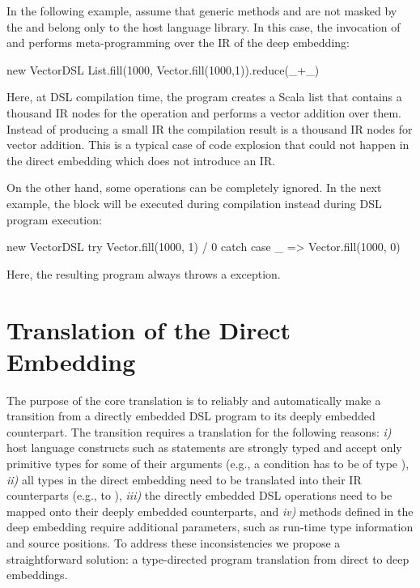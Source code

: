 In the following example, assume that generic methods  and
 are not masked by the  and belong only to the host
language library. In this case, the invocation of  and 
performs meta-programming over the IR of the deep embedding:\vspace{3pt}

\begin{listingtiny}
  new VectorDSL {
    List.fill(1000, Vector.fill(1000,1)).reduce(_+_)
  }
\end{listingtiny}\vspace{3pt}

Here, at DSL compilation time, the program creates a Scala list that contains a thousand
IR nodes for the  operation and performs a vector addition over them.
Instead of producing a small IR the compilation result is a thousand IR nodes for
vector addition. This is a typical case of code explosion that could not happen
in the direct embedding which does not introduce an IR.

On the other hand, some operations can be completely ignored. In the next
example, the  block will be executed during \edsl compilation
instead during DSL program execution:\vspace{3pt}

\begin{listingtiny}
  new VectorDSL {
    try Vector.fill(1000, 1) / 0
    catch { case _ => Vector.fill(1000, 0) }
  }
\end{listingtiny}

Here, the resulting program always throws a 
exception.

\section{Translation of the Direct Embedding}
\label{sec:translation}


The purpose of the core \tool translation is to reliably and automatically make
a transition from a directly embedded DSL program to its deeply embedded
counterpart. The transition requires a translation for the following reasons:
\emph{i)} host language constructs such as  statements are strongly
typed and accept only primitive types for some of their arguments (e.g., a
condition has to be of type ), \emph{ii)} all types in the direct
embedding need to be translated into their IR counterparts (e.g.,  to
), \emph{iii)} the directly embedded DSL operations need to be
mapped onto their deeply embedded counterparts, and \emph{iv)} methods defined
in the deep embedding require additional parameters, such as run-time type
information and source positions. To address these inconsistencies we propose a
straightforward solution: a type-directed program translation from direct to
deep embeddings.

